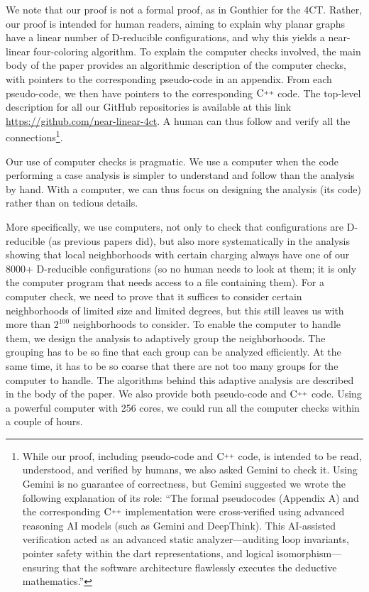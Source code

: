 \documentclass[10pt,a4paper]{article}
\def\Cpp{\textnormal C\raisebox{0.5ex}{\tiny++}}
\begin{document}
We note that our proof is not a formal proof, as in Gonthier \cite{gonthier08} for the 4CT. Rather, our proof is intended for human readers, aiming to explain why planar graphs have a linear number of D-reducible configurations, and why this yields a near-linear four-coloring algorithm. To explain the computer checks involved, the main body of the paper provides an algorithmic description of the computer checks, with pointers to the corresponding pseudo-code in an appendix. From each pseudo-code, we then have pointers to the corresponding $\Cpp$ code. The top-level description for all our GitHub repositories is available at this link \url{https://github.com/near-linear-4ct}. A human can thus follow and verify all the connections\footnote{While our proof, including pseudo-code and $\Cpp$ code, is intended to be read, understood, and verified by humans, we also asked Gemini to check it. Using Gemini is no guarantee of correctness, but Gemini suggested we wrote the following explanation of its role: ``The formal pseudocodes (Appendix A) and the corresponding $\Cpp$ implementation were cross-verified using advanced reasoning AI models (such as Gemini and DeepThink). This AI-assisted verification acted as an advanced static analyzer—auditing loop invariants, pointer safety within the dart representations, and logical isomorphism—ensuring that the software architecture flawlessly executes the deductive mathematics.''}.

Our use of computer checks is pragmatic. We use a computer when the code performing a case analysis is simpler to understand and follow than the analysis by hand.
With a computer, we can thus focus on designing the analysis (its code) rather than on tedious details.

More specifically, we use computers, not only to check that configurations are D-reducible (as previous papers did), but also more systematically in the analysis showing that local 
neighborhoods with certain charging always have one of our 8000+ D-reducible configurations (so no human needs to look at them; it is only the computer program that needs access to a file containing them). For a computer check, we need to prove that it suffices to consider certain neighborhoods of limited size and limited degrees, but this still leaves us with more than $2^{100}$
neighborhoods to consider. To enable the computer to handle them, we design the analysis to adaptively group the neighborhoods. The grouping has to be so fine that each group can be analyzed efficiently. At the same time, it has to be so coarse that there are not too many groups for the computer to handle.
The algorithms behind this adaptive analysis are described in the body of the paper. We also provide both pseudo-code and $\Cpp$ code. Using a powerful computer with 256 cores, we could run all the computer checks within a couple of hours.
\end{document}
